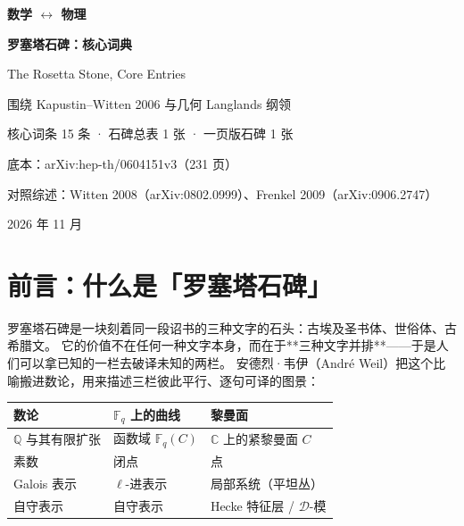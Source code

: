 \begin{titlepage}
\centering
\vspace*{3.2cm}
{\huge\bfseries 数学 $\leftrightarrow$ 物理\par}
\vspace{0.6cm}
{\LARGE\bfseries 罗塞塔石碑：核心词典\par}
\vspace{1.2cm}
{\large The Rosetta Stone, Core Entries\par}
\vspace{0.4cm}
{\large 围绕 Kapustin--Witten 2006 与几何 Langlands 纲领\par}
\vspace{2.2cm}
{\large 核心词条 15 条 · 石碑总表 1 张 · 一页版石碑 1 张\par}
\vspace{0.3cm}
{\large 底本：arXiv:hep-th/0604151v3（231 页）\par}
\vspace{0.3cm}
{\large 对照综述：Witten 2008（arXiv:0802.0999）、Frenkel 2009（arXiv:0906.2747）\par}
\vfill
{\large 2026 年 11 月\par}
\vspace{0.8cm}
\end{titlepage}

\section*{前言：什么是「罗塞塔石碑」}

罗塞塔石碑是一块刻着同一段诏书的三种文字的石头：古埃及圣书体、世俗体、古希腊文。
它的价值不在任何一种文字本身，而在于**三种文字并排**——于是人们可以拿已知的一栏去破译未知的两栏。
安德烈·韦伊（André Weil）把这个比喻搬进数论，用来描述三栏彼此平行、逐句可译的图景：

\begin{center}\small
\begin{tabular}{lll}
\toprule
数论 & $\mathbb F_q$ 上的曲线 & 黎曼面 \\
\midrule
$\mathbb Q$ 与其有限扩张 & 函数域 $\mathbb F_q(C)$ & $\mathbb C$ 上的紧黎曼面 $C$ \\
素数 & 闭点 & 点 \\
Galois 表示 & $\ell$-进表示 & 局部系统（平坦丛） \\
自守表示 & 自守表示 & Hecke 特征层 / $\mathcal D$-模 \\
\bottomrule
\end{tabular}
\end{center}

